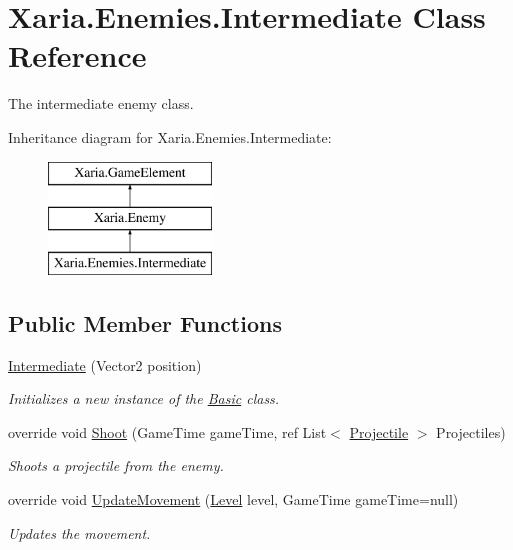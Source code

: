 \hypertarget{classXaria_1_1Enemies_1_1Intermediate}{}\section{Xaria.\+Enemies.\+Intermediate Class Reference}
\label{classXaria_1_1Enemies_1_1Intermediate}


The intermediate enemy class.  


Inheritance diagram for Xaria.\+Enemies.\+Intermediate\+:\begin{figure}[H]
\begin{center}
\leavevmode
\includegraphics[height=3.000000cm]{classXaria_1_1Enemies_1_1Intermediate}
\end{center}
\end{figure}
\subsection*{Public Member Functions}
\begin{DoxyCompactItemize}
\item 
\hyperlink{classXaria_1_1Enemies_1_1Intermediate_a49a6edfc96285296ab02fc225752de38}{Intermediate} (Vector2 position)
\begin{DoxyCompactList}\small\item\em Initializes a new instance of the \hyperlink{classXaria_1_1Enemies_1_1Basic}{Basic} class. \end{DoxyCompactList}\item 
override void \hyperlink{classXaria_1_1Enemies_1_1Intermediate_a841e04a489be7bf4a75e002ae8b10dcd}{Shoot} (Game\+Time game\+Time, ref List$<$ \hyperlink{classXaria_1_1Projectile}{Projectile} $>$ Projectiles)
\begin{DoxyCompactList}\small\item\em Shoots a projectile from the enemy. \end{DoxyCompactList}\item 
override void \hyperlink{classXaria_1_1Enemies_1_1Intermediate_a2b9bcfbfd205f279db56bb86c776c07a}{Update\+Movement} (\hyperlink{classXaria_1_1Level}{Level} level, Game\+Time game\+Time=null)
\begin{DoxyCompactList}\small\item\em Updates the movement. \end{DoxyCompactList}\end{DoxyCompactItemize}
